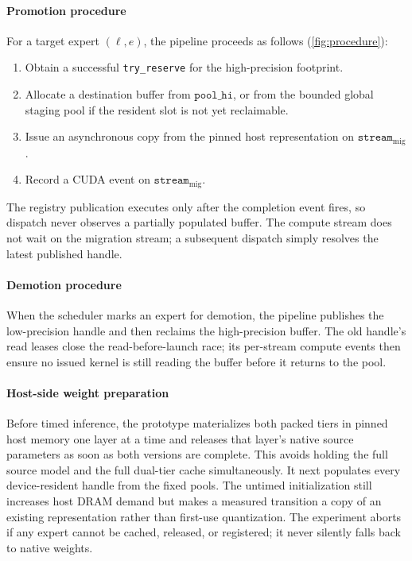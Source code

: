 \paragraph{Promotion procedure}
For a target expert $(\ell,e)$, the pipeline proceeds as follows (\autoref{fig:procedure}):
\begin{enumerate}[leftmargin=1.5em, itemsep=0pt, topsep=2pt]
\item Obtain a successful \texttt{try\_reserve} for the high-precision footprint.
\item Allocate a destination buffer from $\texttt{pool\_hi}$, or from the bounded global staging pool if the resident slot is not yet reclaimable.
\item Issue an asynchronous copy from the pinned host representation on $\texttt{stream}_{\text{mig}}$.
\item Record a CUDA event on $\texttt{stream}_{\text{mig}}$.
\end{enumerate}
The registry publication executes only after the completion event fires, so dispatch never observes a partially populated buffer. The compute stream does not wait on the migration stream; a subsequent dispatch simply resolves the latest published handle.

\paragraph{Demotion procedure}
When the scheduler marks an expert for demotion, the pipeline publishes the low-precision handle and then reclaims the high-precision buffer. The old handle's read leases close the read-before-launch race; its per-stream compute events then ensure no issued kernel is still reading the buffer before it returns to the pool.

\paragraph{Host-side weight preparation}
Before timed inference, the prototype materializes both packed tiers in pinned host memory one layer at a time and releases that layer's native source parameters as soon as both versions are complete. This avoids holding the full source model and the full dual-tier cache simultaneously. It next populates every device-resident handle from the fixed pools. The untimed initialization still increases host DRAM demand but makes a measured transition a copy of an existing representation rather than first-use quantization. The experiment aborts if any expert cannot be cached, released, or registered; it never silently falls back to native weights.
